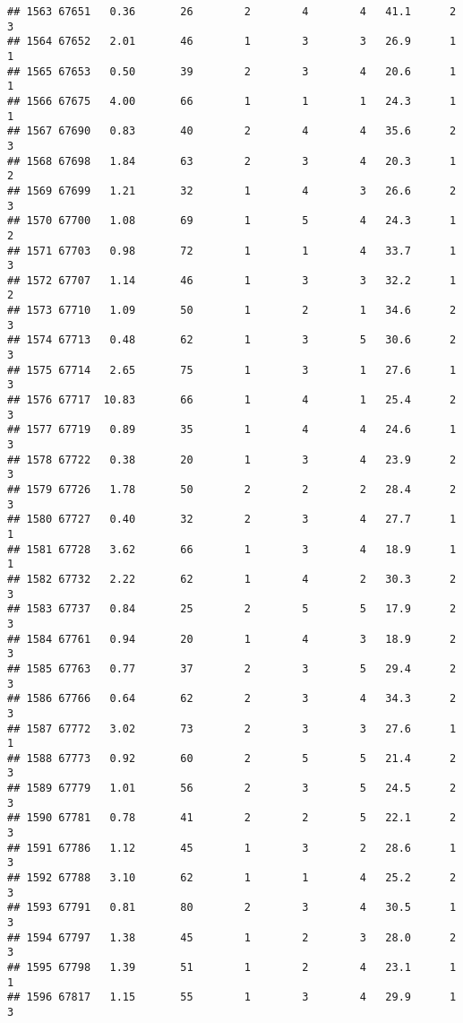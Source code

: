 \documentclass[
]{article}
\begin{document}
\begin{verbatim}
## 1563 67651   0.36       26        2        4        4   41.1      2      3
## 1564 67652   2.01       46        1        3        3   26.9      1      1
## 1565 67653   0.50       39        2        3        4   20.6      1      1
## 1566 67675   4.00       66        1        1        1   24.3      1      1
## 1567 67690   0.83       40        2        4        4   35.6      2      3
## 1568 67698   1.84       63        2        3        4   20.3      1      2
## 1569 67699   1.21       32        1        4        3   26.6      2      3
## 1570 67700   1.08       69        1        5        4   24.3      1      2
## 1571 67703   0.98       72        1        1        4   33.7      1      3
## 1572 67707   1.14       46        1        3        3   32.2      1      2
## 1573 67710   1.09       50        1        2        1   34.6      2      3
## 1574 67713   0.48       62        1        3        5   30.6      2      3
## 1575 67714   2.65       75        1        3        1   27.6      1      3
## 1576 67717  10.83       66        1        4        1   25.4      2      3
## 1577 67719   0.89       35        1        4        4   24.6      1      3
## 1578 67722   0.38       20        1        3        4   23.9      2      3
## 1579 67726   1.78       50        2        2        2   28.4      2      3
## 1580 67727   0.40       32        2        3        4   27.7      1      1
## 1581 67728   3.62       66        1        3        4   18.9      1      1
## 1582 67732   2.22       62        1        4        2   30.3      2      3
## 1583 67737   0.84       25        2        5        5   17.9      2      3
## 1584 67761   0.94       20        1        4        3   18.9      2      3
## 1585 67763   0.77       37        2        3        5   29.4      2      3
## 1586 67766   0.64       62        2        3        4   34.3      2      3
## 1587 67772   3.02       73        2        3        3   27.6      1      1
## 1588 67773   0.92       60        2        5        5   21.4      2      3
## 1589 67779   1.01       56        2        3        5   24.5      2      3
## 1590 67781   0.78       41        2        2        5   22.1      2      3
## 1591 67786   1.12       45        1        3        2   28.6      1      3
## 1592 67788   3.10       62        1        1        4   25.2      2      3
## 1593 67791   0.81       80        2        3        4   30.5      1      3
## 1594 67797   1.38       45        1        2        3   28.0      2      3
## 1595 67798   1.39       51        1        2        4   23.1      1      1
## 1596 67817   1.15       55        1        3        4   29.9      1      3

\end{verbatim}
\end{document}
